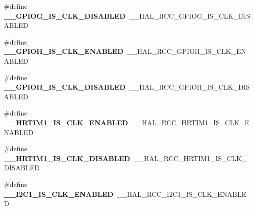 \begin{DoxyCompactItemize}
\item 
\hypertarget{group___h_a_l___r_c_c___aliased_ga23da605d52cb9d8ead303c3a4cee0e0f}{\#define {\bfseries \-\_\-\-\_\-\-G\-P\-I\-O\-G\-\_\-\-I\-S\-\_\-\-C\-L\-K\-\_\-\-D\-I\-S\-A\-B\-L\-E\-D}~\-\_\-\-\_\-\-H\-A\-L\-\_\-\-R\-C\-C\-\_\-\-G\-P\-I\-O\-G\-\_\-\-I\-S\-\_\-\-C\-L\-K\-\_\-\-D\-I\-S\-A\-B\-L\-E\-D}\label{group___h_a_l___r_c_c___aliased_ga23da605d52cb9d8ead303c3a4cee0e0f}

\item 
\hypertarget{group___h_a_l___r_c_c___aliased_ga7447541153d72d8e96a5939e751d2b12}{\#define {\bfseries \-\_\-\-\_\-\-G\-P\-I\-O\-H\-\_\-\-I\-S\-\_\-\-C\-L\-K\-\_\-\-E\-N\-A\-B\-L\-E\-D}~\-\_\-\-\_\-\-H\-A\-L\-\_\-\-R\-C\-C\-\_\-\-G\-P\-I\-O\-H\-\_\-\-I\-S\-\_\-\-C\-L\-K\-\_\-\-E\-N\-A\-B\-L\-E\-D}\label{group___h_a_l___r_c_c___aliased_ga7447541153d72d8e96a5939e751d2b12}

\item 
\hypertarget{group___h_a_l___r_c_c___aliased_ga4e5617180a05e001e52000706cf4d14a}{\#define {\bfseries \-\_\-\-\_\-\-G\-P\-I\-O\-H\-\_\-\-I\-S\-\_\-\-C\-L\-K\-\_\-\-D\-I\-S\-A\-B\-L\-E\-D}~\-\_\-\-\_\-\-H\-A\-L\-\_\-\-R\-C\-C\-\_\-\-G\-P\-I\-O\-H\-\_\-\-I\-S\-\_\-\-C\-L\-K\-\_\-\-D\-I\-S\-A\-B\-L\-E\-D}\label{group___h_a_l___r_c_c___aliased_ga4e5617180a05e001e52000706cf4d14a}

\item 
\hypertarget{group___h_a_l___r_c_c___aliased_gae84c10963c2caf54c3937a2238a53a94}{\#define {\bfseries \-\_\-\-\_\-\-H\-R\-T\-I\-M1\-\_\-\-I\-S\-\_\-\-C\-L\-K\-\_\-\-E\-N\-A\-B\-L\-E\-D}~\-\_\-\-\_\-\-H\-A\-L\-\_\-\-R\-C\-C\-\_\-\-H\-R\-T\-I\-M1\-\_\-\-I\-S\-\_\-\-C\-L\-K\-\_\-\-E\-N\-A\-B\-L\-E\-D}\label{group___h_a_l___r_c_c___aliased_gae84c10963c2caf54c3937a2238a53a94}

\item 
\hypertarget{group___h_a_l___r_c_c___aliased_ga85ad0fee52b035d3663383cb1726c851}{\#define {\bfseries \-\_\-\-\_\-\-H\-R\-T\-I\-M1\-\_\-\-I\-S\-\_\-\-C\-L\-K\-\_\-\-D\-I\-S\-A\-B\-L\-E\-D}~\-\_\-\-\_\-\-H\-A\-L\-\_\-\-R\-C\-C\-\_\-\-H\-R\-T\-I\-M1\-\_\-\-I\-S\-\_\-\-C\-L\-K\-\_\-\-D\-I\-S\-A\-B\-L\-E\-D}\label{group___h_a_l___r_c_c___aliased_ga85ad0fee52b035d3663383cb1726c851}

\item 
\hypertarget{group___h_a_l___r_c_c___aliased_gafa49d489dd7544b4bcf0c5edca14f721}{\#define {\bfseries \-\_\-\-\_\-\-I2\-C1\-\_\-\-I\-S\-\_\-\-C\-L\-K\-\_\-\-E\-N\-A\-B\-L\-E\-D}~\-\_\-\-\_\-\-H\-A\-L\-\_\-\-R\-C\-C\-\_\-\-I2\-C1\-\_\-\-I\-S\-\_\-\-C\-L\-K\-\_\-\-E\-N\-A\-B\-L\-E\-D}\label{group___h_a_l___r_c_c___aliased_gafa49d489dd7544b4bcf0c5edca14f721}


\end{DoxyCompactItemize}
